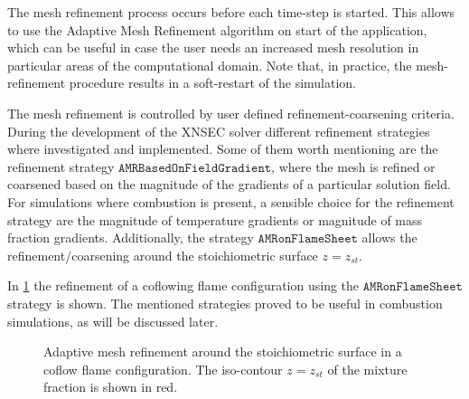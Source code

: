 The mesh refinement process occurs before each time-step is started. This allows to use the Adaptive Mesh Refinement algorithm on start of the application, which can be useful in case the user needs an increased mesh resolution in particular areas of the computational domain. Note that, in practice, the mesh-refinement procedure results in a soft-restart of the simulation. 
\begin{sloppypar}
The mesh refinement is controlled by user defined refinement-coarsening criteria. During the development of the XNSEC solver different refinement strategies where investigated and implemented. Some of them worth mentioning are the refinement strategy  $\texttt{AMRBasedOnFieldGradient}$, where the mesh is refined or coarsened based on the magnitude of the gradients of a particular solution field. For simulations where combustion is present, a sensible choice for the refinement strategy are the magnitude of temperature gradients or magnitude of mass fraction gradients. Additionally, the strategy $\texttt{AMRonFlameSheet}$ allows the refinement/coarsening around the stoichiometric surface $z = z_{st}$.
\end{sloppypar}
In \cref{fig:CoFlowMeshStrategy} the refinement of a coflowing flame configuration using the $\texttt{AMRonFlameSheet}$ strategy is shown. The mentioned strategies proved to be useful in combustion simulations, as will be discussed later.


\begin{figure}
	\centering
	\pgfplotsset{width=0.50\textwidth, compat=1.3}
	\caption{Adaptive mesh refinement around the stoichiometric surface in a coflow flame configuration. The iso-contour $z = z_{st}$ of the mixture fraction is shown in red.}\label{fig:CoFlowMeshStrategy}
\end{figure}
